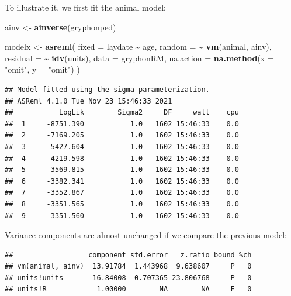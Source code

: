 \documentclass[
  12pt,
]{book}
\newenvironment{Shaded}{\begin{snugshade}}{\end{snugshade}}
\newcommand{\DataTypeTok}[1]{\textcolor[rgb]{0.13,0.29,0.53}{#1}}
\newcommand{\KeywordTok}[1]{\textcolor[rgb]{0.13,0.29,0.53}{\textbf{#1}}}
\newcommand{\NormalTok}[1]{#1}
\newcommand{\OperatorTok}[1]{\textcolor[rgb]{0.81,0.36,0.00}{\textbf{#1}}}
\newcommand{\StringTok}[1]{\textcolor[rgb]{0.31,0.60,0.02}{#1}}
\begin{document}
To illustrate it, we first fit the animal model:

\begin{Shaded}
\begin{Highlighting}[]
\NormalTok{ainv \textless{}{-}}\StringTok{ }\KeywordTok{ainverse}\NormalTok{(gryphonped)}

\NormalTok{modelx \textless{}{-}}\StringTok{ }\KeywordTok{asreml}\NormalTok{(}
  \DataTypeTok{fixed =}\NormalTok{ laydate }\OperatorTok{\textasciitilde{}}\StringTok{ }\NormalTok{age,}
  \DataTypeTok{random =} \OperatorTok{\textasciitilde{}}\StringTok{ }\KeywordTok{vm}\NormalTok{(animal, ainv),}
  \DataTypeTok{residual =} \OperatorTok{\textasciitilde{}}\StringTok{ }\KeywordTok{idv}\NormalTok{(units),}
  \DataTypeTok{data =}\NormalTok{ gryphonRM,}
  \DataTypeTok{na.action =} \KeywordTok{na.method}\NormalTok{(}\DataTypeTok{x =} \StringTok{"omit"}\NormalTok{, }\DataTypeTok{y =} \StringTok{"omit"}\NormalTok{)}
\NormalTok{)}
\end{Highlighting}
\end{Shaded}

\begin{verbatim}
## Model fitted using the sigma parameterization.
## ASReml 4.1.0 Tue Nov 23 15:46:33 2021
##           LogLik        Sigma2     DF     wall    cpu
##  1     -8751.390           1.0   1602 15:46:33    0.0
##  2     -7169.205           1.0   1602 15:46:33    0.0
##  3     -5427.604           1.0   1602 15:46:33    0.0
##  4     -4219.598           1.0   1602 15:46:33    0.0
##  5     -3569.815           1.0   1602 15:46:33    0.0
##  6     -3382.341           1.0   1602 15:46:33    0.0
##  7     -3352.867           1.0   1602 15:46:33    0.0
##  8     -3351.565           1.0   1602 15:46:33    0.0
##  9     -3351.560           1.0   1602 15:46:33    0.0
\end{verbatim}

Variance components are almost unchanged if we compare the previous model:

\begin{Shaded}
\end{Shaded}

\begin{verbatim}
##                  component std.error   z.ratio bound %ch
## vm(animal, ainv)  13.91784  1.443968  9.638607     P   0
## units!units       16.84008  0.707365 23.806768     P   0
## units!R            1.00000        NA        NA     F   0
\end{verbatim}
\end{document}

